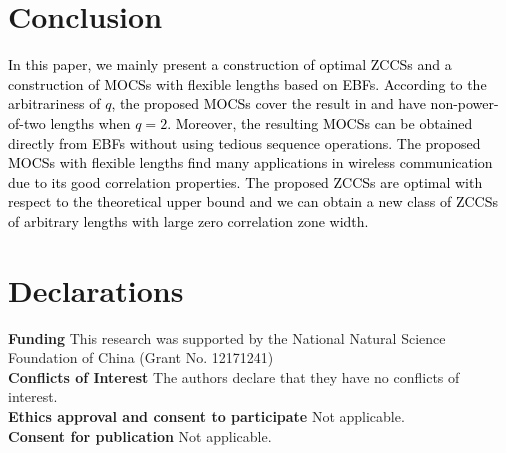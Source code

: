 \documentclass[11pt]{article}
\newcommand{\2} {$2$-to-$1$}
\begin{document}
\section{Conclusion}
\textcolor{black}{In this paper, we mainly present a construction of optimal ZCCSs and  a construction of MOCSs with flexible lengths based on EBFs.  According to the arbitrariness of $q$, the proposed MOCSs cover the result in \cite{PS2} and have non-power-of-two lengths when $q=2$.
Moreover, the resulting MOCSs can be obtained directly from EBFs without using  tedious sequence operations. The proposed MOCSs with flexible lengths  find many applications in wireless communication due to its good correlation properties.
The proposed ZCCSs are optimal with respect to the theoretical upper bound and  we can obtain a new class of ZCCSs of arbitrary lengths with large zero correlation zone width. }



\section*{Declarations}
\textbf{Funding}  This research was supported by the National Natural Science Foundation of China (Grant No.
12171241)\\
\textbf{Conflicts of Interest} The authors declare that they have no conflicts of interest.\\
\textbf{Ethics approval and consent to participate} Not applicable.\\
\textbf{Consent for publication} Not applicable.
\end{document}
